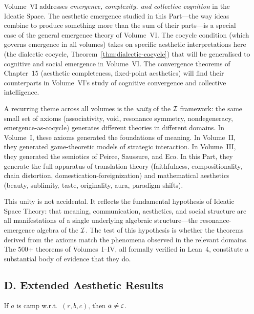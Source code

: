 \begin{remark}
Volume~VI addresses \emph{emergence, complexity, and collective cognition} in the Ideatic Space.  The aesthetic emergence studied in this Part---the way ideas combine to produce something more than the sum of their parts---is a special case of the general emergence theory of Volume~VI.  The cocycle condition (which governs emergence in all volumes) takes on specific aesthetic interpretations here (the dialectic cocycle, Theorem~\ref{thm:dialectic-cocycle}) that will be generalised to cognitive and social emergence in Volume~VI.  The convergence theorems of Chapter~15 (aesthetic completeness, fixed-point aesthetics) will find their counterparts in Volume~VI's study of cognitive convergence and collective intelligence.
\end{remark}

\begin{remark}
A recurring theme across all volumes is the \emph{unity} of the $\mathcal{I}$ framework: the same small set of axioms (associativity, void, resonance symmetry, nondegeneracy, emergence-as-cocycle) generates different theories in different domains.  In Volume~I, these axioms generated the foundations of meaning.  In Volume~II, they generated game-theoretic models of strategic interaction.  In Volume~III, they generated the semiotics of Peirce, Saussure, and Eco.  In this Part, they generate the full apparatus of translation theory (faithfulness, compositionality, chain distortion, domestication-foreignization) and mathematical aesthetics (beauty, sublimity, taste, originality, aura, paradigm shifts).

This unity is not accidental.  It reflects the fundamental hypothesis of Ideatic Space Theory: that meaning, communication, aesthetics, and social structure are all manifestations of a single underlying algebraic structure---the resonance-emergence algebra of the $\mathcal{I}$.  The test of this hypothesis is whether the theorems derived from the axioms match the phenomena observed in the relevant domains.  The 500+ theorems of Volumes~I--IV, all formally verified in Lean~4, constitute a substantial body of evidence that they do.
\end{remark}

\subsection*{D. Extended Aesthetic Results}

\begin{theorem}
\label{thm:camp-non-void}
If $a$ is camp w.r.t.\ $(r, b, c)$, then $a \neq \varepsilon$.
\end{theorem}

